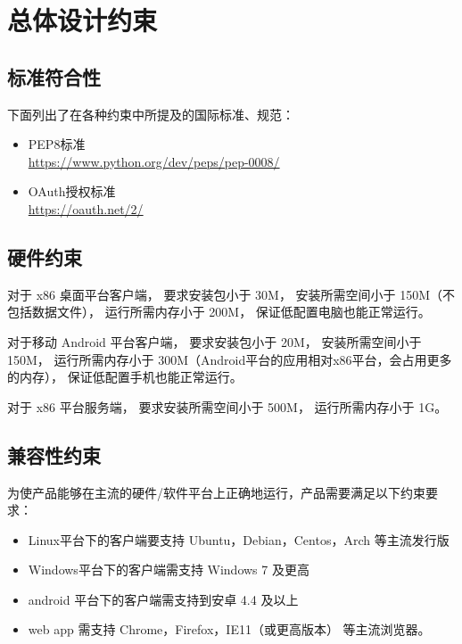 \chapter{总体设计约束}

 
\section{标准符合性}
下面列出了在各种约束中所提及的国际标准、规范：
\begin{itemize}
    \item PEP8标准\\
    \url{https://www.python.org/dev/peps/pep-0008/}
    \item OAuth授权标准\\
    \url{https://oauth.net/2/}
\end{itemize}

\section{硬件约束}


对于 x86 桌面平台客户端，
要求安装包小于 30M，
安装所需空间小于 150M（不包括数据文件），
运行所需内存小于 200M，
保证低配置电脑也能正常运行。

对于移动 Android 平台客户端，
要求安装包小于 20M，
安装所需空间小于 150M，
运行所需内存小于 300M（Android平台的应用相对x86平台，会占用更多的内存），
保证低配置手机也能正常运行。

对于 x86 平台服务端，
要求安装所需空间小于 500M，
运行所需内存小于 1G。

\section{兼容性约束}
为使产品能够在主流的硬件/软件平台上正确地运行，产品需要满足以下约束要求：
\begin{itemize}
    \item Linux平台下的客户端要支持 Ubuntu，Debian，Centos，Arch 等主流发行版
    \item Windows平台下的客户端需支持 Windows 7 及更高
    \item android 平台下的客户端需支持到安卓 4.4 及以上
    \item web app 需支持 Chrome，Firefox，IE11（或更高版本） 等主流浏览器。
    \end{itemize}

